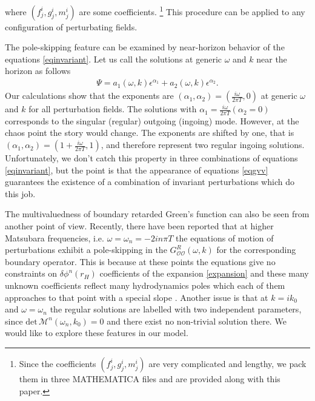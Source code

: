 \documentclass[preprintnumbers,aps,prd,longbibliography,nofootinbib,nobibnotes,amsmath,amssymb]{revtex4}
\begin{document}
 where $(f^i_j, g^i_j, m^i_j)$ are some coefficients. \footnote{Since the coefficients $(f^i_j, g^i_j, m^i_j)$ are very complicated and lengthy, we pack them in three MATHEMATICA files and are provided along with this paper.}   This  procedure can be applied to any configuration of perturbating fields. 
 
 The pole-skipping feature can be examined by near-horizon behavior  of the equations \eqref{eqinvariant}. Let us call the solutions at generic $\omega$ and $k$ near the horizon as follows
\begin{align}\label{eq419}
	\Psi = a_1(\omega, k)\epsilon^{\alpha_1} + a_2(\omega, k)\epsilon^{\alpha_2}.
\end{align}
Our calculations show that the exponents are $(\alpha_1, \alpha_2) = (\frac{i \omega}{2 \pi  T}, 0)$ at generic  $\omega$ and $k$ for all perturbation fields. The solutions with $\alpha_1 = \frac{i \omega}{2 \pi  T}(\alpha_2 = 0)$ corresponds to the singular (regular) outgoing (ingoing) mode. However, at the chaos point  the story would change. The exponents are shifted by one, that is $(\alpha_1, \alpha_2) = (1+\frac{i \omega}{2 \pi  T}, 1)$,  and therefore represent two regular ingoing solutions. Unfortunately, we don't catch this property in three combinations of equations \eqref{eqinvariant}, but the point is that the appearance of equations \eqref{eqgvv} guarantees the existence of a combination of invariant perturbations which do this job.


The multivaluedness of boundary retarded Green's function can also be seen from another point of view. Recently, there have been reported that  at higher Matsubara frequencies, i.e. $\omega = \omega_n = - 2 i n \pi T$  the equations of motion of  perturbations exhibit a pole-skipping in  the $G^R_{\mathcal{O}  \mathcal{O}}(\omega, k)$ for the corresponding boundary operator\cite{Grozdanov:2019uhi, Grozdanov:2023txs, Blake:2019otz}. This is because at these points the equations give no constraints on $\delta \phi^n(r_H)$ coefficients of the expansion \eqref{expansion} and these many unknown coefficients reflect many hydrodynamics poles which each of them approaches  to that point with a special slope \cite{Blake:2019otz}. Another issue is that at $k = i k_0$ and $\omega = \omega_n$ the regular solutions are labelled with two independent parameters, since $\mbox{det}\, \mathcal{M}^n(\omega_n, k_0) = 0$ and there exist no non-trivial solution  there. We would like to explore these features in our model.
\end{document}
